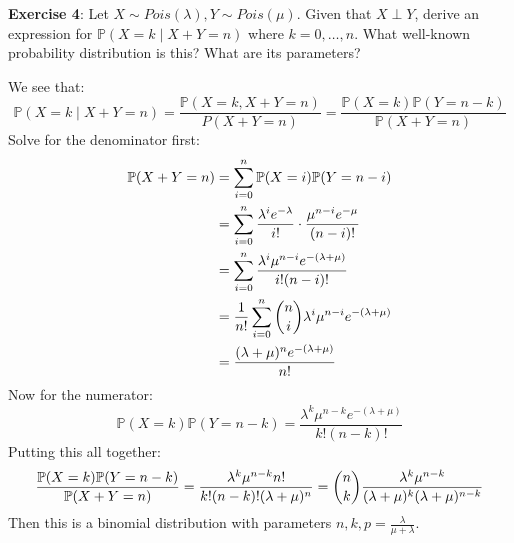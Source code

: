 \documentclass{article}
\begin{document}
    \textbf{Exercise 4}: Let $X \sim Pois(\lambda), Y \sim Pois(\mu)$. Given that $X \perp Y$, derive an expression for $\mathbb{P}(X = k \mid X + Y = n)$ where $k = 0, \ldots, n$. What well-known probability distribution is this? What are its parameters? 
        \begin{answer}
            We see that:
                \begin{equation*}
                    \mathbb{P}(X = k \mid X + Y = n) = \dfrac{\mathbb{P}(X = k, X + Y = n)}{P(X + Y = n)} = \dfrac{\mathbb{P}(X =k)\mathbb{P}(Y = n - k)}{\mathbb{P}(X + Y = n)}
                \end{equation*}
            Solve for the denominator first:
                \begin{align*}
                    \mathbb{P}(X + Y = n) &= \sum_{i = 0}^{n}\mathbb{P}(X = i)\mathbb{P}(Y = n - i)                                           \\
                                          &= \sum_{i = 0}^{n} \dfrac{\lambda^{i}e^{-\lambda}}{i!} \cdot \dfrac{\mu^{n - i}e^{-\mu}}{(n - i)!} \\
                                          &= \sum_{i = 0}^{n} \dfrac{\lambda^{i}\mu^{n - i}e^{-(\lambda + \mu)}}{i!(n - i)!}                  \\
                                          &= \dfrac{1}{n!} \sum_{i = 0}^{n} \dbinom{n}{i} \lambda^{i}\mu^{n - i}e^{-(\lambda + \mu)}          \\
                                          &= \dfrac{(\lambda + \mu)^{n}e^{-(\lambda + \mu)}}{n!}                                                
                \end{align*}
            Now for the numerator:
                \begin{equation*}
                    \mathbb{P}(X = k)\mathbb{P}(Y = n - k) = \dfrac{\lambda^{k}\mu^{n - k}e^{-(\lambda + \mu)}}{k!(n - k)!}
                \end{equation*}
            Putting this all together:
                \begin{equation*}
                    \dfrac{\mathbb{P}(X = k)\mathbb{P}(Y = n - k)}{\mathbb{P}(X + Y = n)} = \dfrac{\lambda^{k}\mu^{n - k}n!}{k!(n - k)!(\lambda + \mu)^{n}} = \dbinom{n}{k} \dfrac{\lambda^{k}\mu^{n - k}}{(\lambda + \mu)^{k}(\lambda + \mu)^{n - k}}
                \end{equation*}
            Then this is a binomial distribution with parameters $n, k, p = \frac{\lambda}{\mu + \lambda}$.
        \end{answer}
\end{document}
